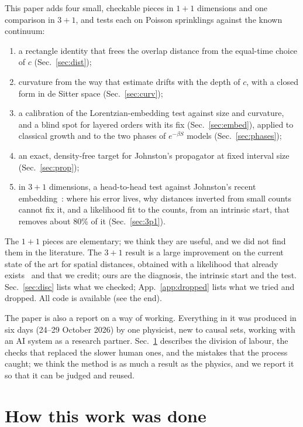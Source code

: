 \documentclass[11pt,a4paper]{article}
\begin{document}
This paper adds four small, checkable pieces in $1+1$ dimensions and one comparison in $3+1$, and tests each on Poisson sprinklings against the known continuum:
\begin{enumerate}[leftmargin=*,itemsep=1pt]
\item a rectangle identity that frees the overlap distance from the equal-time choice of $c$ (Sec.~\ref{sec:dist});
\item curvature from the way that estimate drifts with the depth of $c$, with a closed form in de Sitter space (Sec.~\ref{sec:curv});
\item a calibration of the Lorentzian-embedding test against size and curvature, and a blind spot for layered orders with its fix (Sec.~\ref{sec:embed}), applied to classical growth and to the two phases of $e^{-\beta S}$ models (Sec.~\ref{sec:phases});
\item an exact, density-free target for Johnston's propagator at fixed interval size (Sec.~\ref{sec:prop});
\item in $3+1$ dimensions, a head-to-head test against Johnston's recent embedding~\cite{Johnston25}: where his error lives, why distances inverted from small counts cannot fix it, and a likelihood fit to the counts, from an intrinsic start, that removes about $80\%$ of it (Sec.~\ref{sec:3p1}).
\end{enumerate}
The $1+1$ pieces are elementary; we think they are useful, and we did not find them in the literature. The $3+1$ result is a large improvement on the current state of the art for spatial distances, obtained with a likelihood that already exists~\cite{Casasola26} and that we credit; ours are the diagnosis, the intrinsic start and the test. Sec.~\ref{sec:disc} lists what we checked; App.~\ref{app:dropped} lists what we tried and dropped. All code is available (see the end).

The paper is also a report on a way of working. Everything in it was produced in six days (24--29 October 2026) by one physicist, new to causal sets, working with an AI system as a research partner. Sec.~\ref{sec:method} describes the division of labour, the checks that replaced the slower human ones, and the mistakes that the process caught; we think the method is as much a result as the physics, and we report it so that it can be judged and reused.

\section{How this work was done}\label{sec:method}
\end{document}
